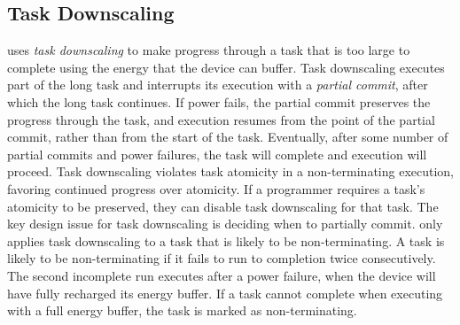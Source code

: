 


\label{sec:task_downsizing}
\subsection{Task Downscaling}
\sys uses {\em task downscaling} to make progress through a task that is too large to complete using the energy that the device can buffer. Task downscaling executes part of the long task and interrupts its execution with a {\em partial commit}, after which the long task continues. If power fails, the partial commit preserves the progress through the task, and execution resumes from the point of the partial commit, rather than from the start of the task. Eventually, after some number of partial commits and power failures, the task will complete and execution will proceed. Task downscaling violates task atomicity in a non-terminating execution, favoring continued progress over atomicity. If a programmer requires a task's atomicity to be preserved, they can disable task downscaling for that task.
The key design issue for task downscaling is deciding when to partially commit. \sys only applies task downscaling to a task that is likely to be non-terminating.  A task is likely to be non-terminating if it fails to run to completion twice consecutively. The second incomplete run executes after a power failure, when the device will have fully recharged its energy buffer. If a task cannot complete when executing with a full energy buffer, the task is marked as non-terminating.

